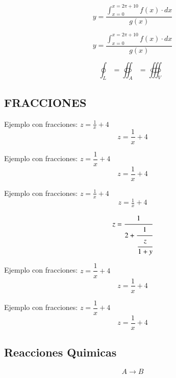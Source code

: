 \documentclass[12pt,letterpaper]{article}
\begin{document}
\begin{equation}
y = \dfrac{\int_{x=0}^{x=2 \pi + 10} f(x) \cdot dx}{g(x)}
\end{equation}



\begin{equation}
y = \dfrac{\displaystyle \int_{x=0}^{x=2 \pi + 10} f(x) \cdot dx}{g(x)}
\end{equation}




\begin{equation}
\oint_L = \oiint_A = \oiiint_V
\end{equation}

\newpage
\subsection{FRACCIONES}


Ejemplo con fracciones:  $z = \frac{1}{x} + 4$
\begin{equation}
 z = \frac{1}{x} + 4
\end{equation}

Ejemplo con fracciones:  $z = \dfrac{1}{x} + 4$
\begin{equation}
 z = \dfrac{1}{x} + 4
\end{equation}


Ejemplo con fracciones:  $z = \tfrac{1}{x} + 4$
\begin{equation}
 z = \tfrac{1}{x} + 4
\end{equation}



\begin{equation}
 z = \cfrac{1}{2 + \cfrac{1}{\cfrac{z}{1+y}}}
\end{equation}


Ejemplo con fracciones:  $z = \dfrac{1}{x} + 4$
\begin{equation}
 z = \dfrac{1}{x} + 4
\end{equation}




Ejemplo con fracciones:  $z = \dfrac{1}{x} + 4$
\begin{equation}
 z = \dfrac{1}{x} + 4
\end{equation}


\newpage
\subsection{Reacciones Quimicas}


\begin{equation} \label{reac:A2B}
A \rightarrow B
\end{equation}
\end{document}
